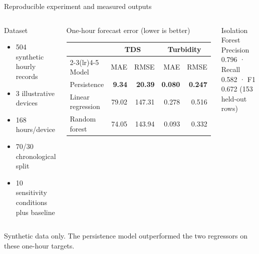 \documentclass[aspectratio=169,10pt]{beamer}
\begin{document}
\begin{frame}{Reproducible experiment and measured outputs}
\begin{columns}[T,onlytextwidth]
  \begin{block}{Dataset}
    \begin{itemize}
      \item 504 synthetic hourly records
      \item 3 illustrative devices
      \item 168 hours/device
      \item 70/30 chronological split
      \item 10 sensitivity conditions plus baseline
    \end{itemize}
  \end{block}
  \begin{block}{One-hour forecast error (lower is better)}
    \centering\scriptsize
    \begin{tabular}{lrrrr}
      \toprule
      & \multicolumn{2}{c}{TDS} & \multicolumn{2}{c}{Turbidity}\\
      \cmidrule(lr){2-3}\cmidrule(lr){4-5}
      Model & MAE & RMSE & MAE & RMSE\\
      \midrule
      Persistence & \textbf{9.34} & \textbf{20.39} & \textbf{0.080} & \textbf{0.247}\\
      Linear regression & 79.02 & 147.31 & 0.278 & 0.516\\
      Random forest & 74.05 & 143.94 & 0.093 & 0.332\\
      \bottomrule
    \end{tabular}
  \end{block}
  \begin{block}{Isolation Forest}
    Precision 0.796 · Recall 0.582 · F1 0.672 (153 held-out rows)
  \end{block}
\end{columns}
{\tiny Synthetic data only. The persistence model outperformed the two regressors on these one-hour targets.}
\end{frame}
\end{document}
